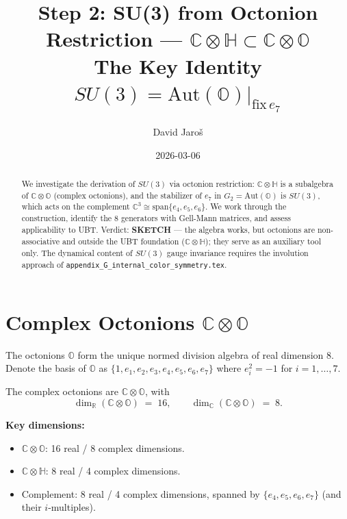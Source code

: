\documentclass[12pt,a4paper]{article}
\title{\textbf{Step 2: SU(3) from Octonion Restriction --- $\mathbb{C}\otimes\mathbb{H} \subset \mathbb{C}\otimes\mathbb{O}$}\\
         \large The Key Identity $SU(3) = \mathrm{Aut}(\mathbb{O})|_{\mathrm{fix\,}e_7}$}
\author{David Jaro\v{s}}
\date{2026-03-06}
\theoremstyle{definition}
\theoremstyle{remark}
\begin{document}
  \maketitle

  \begin{abstract}
  We investigate the derivation of $SU(3)$ via octonion restriction:
  $\mathbb{C}\otimes\mathbb{H}$ is a subalgebra of $\mathbb{C}\otimes\mathbb{O}$
  (complex octonions), and the stabilizer of $e_7$ in $G_2 = \mathrm{Aut}(\mathbb{O})$
  is $SU(3)$, which acts on the complement $\mathbb{C}^3 \cong
  \mathrm{span}\{e_4, e_5, e_6\}$.  We work through the construction,
  identify the 8 generators with Gell-Mann matrices, and assess applicability
  to UBT.  Verdict: \textbf{SKETCH} --- the algebra works, but octonions
  are non-associative and outside the UBT foundation ($\mathbb{C}\otimes\mathbb{H}$);
  they serve as an auxiliary tool only.  The dynamical content of $SU(3)$
  gauge invariance requires the involution approach of
  \texttt{appendix\_G\_internal\_color\_symmetry.tex}.
  \end{abstract}
\fi

\section{Complex Octonions $\mathbb{C}\otimes\mathbb{O}$}
\label{sec:coct}

The octonions $\mathbb{O}$ form the unique normed division algebra of
real dimension 8.  Denote the basis of $\mathbb{O}$ as
$\{1, e_1, e_2, e_3, e_4, e_5, e_6, e_7\}$ where
$e_i^2 = -1$ for $i = 1,\ldots,7$.

The complex octonions are $\mathbb{C}\otimes\mathbb{O}$, with
\begin{equation}
  \dim_\mathbb{R}(\mathbb{C}\otimes\mathbb{O}) \;=\; 16,
  \qquad
  \dim_\mathbb{C}(\mathbb{C}\otimes\mathbb{O}) \;=\; 8.
\end{equation}

\begin{insightbox}
\textbf{Key dimensions:}
\begin{itemize}
  \item $\mathbb{C}\otimes\mathbb{O}$: 16 real / 8 complex dimensions.
  \item $\mathbb{C}\otimes\mathbb{H}$: 8 real / 4 complex dimensions.
  \item Complement: 8 real / 4 complex dimensions, spanned by
        $\{e_4, e_5, e_6, e_7\}$ (and their $i$-multiples).
\end{itemize}
\end{insightbox}
\end{document}
